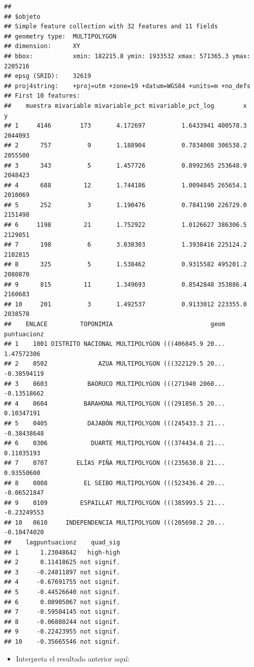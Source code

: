 \documentclass[11pt,]{article}
\providecommand{\tightlist}{%
\setlength{\itemsep}{0pt}\setlength{\parskip}{0pt}}
\begin{document}
\begin{verbatim}
## 
## $objeto
## Simple feature collection with 32 features and 11 fields
## geometry type:  MULTIPOLYGON
## dimension:      XY
## bbox:           xmin: 182215.8 ymin: 1933532 xmax: 571365.3 ymax: 2205216
## epsg (SRID):    32619
## proj4string:    +proj=utm +zone=19 +datum=WGS84 +units=m +no_defs
## First 10 features:
##    muestra mivariable mivariable_pct mivariable_pct_log        x       y
## 1     4146        173       4.172697          1.6433941 400578.3 2044093
## 2      757          9       1.188904          0.7834008 306538.2 2055500
## 3      343          5       1.457726          0.8992365 253648.9 2048423
## 4      688         12       1.744186          1.0094845 265654.1 2010069
## 5      252          3       1.190476          0.7841190 226729.0 2151498
## 6     1198         21       1.752922          1.0126627 386306.5 2129851
## 7      198          6       3.030303          1.3938416 225124.2 2102815
## 8      325          5       1.538462          0.9315582 495201.2 2080870
## 9      815         11       1.349693          0.8542848 353886.4 2160683
## 10     201          3       1.492537          0.9133012 223355.0 2038578
##    ENLACE         TOPONIMIA                           geom puntuacionz
## 1    1001 DISTRITO NACIONAL MULTIPOLYGON (((406845.9 20...  1.47572306
## 2    0502              AZUA MULTIPOLYGON (((322129.5 20... -0.38594119
## 3    0603           BAORUCO MULTIPOLYGON (((271940 2060... -0.13518662
## 4    0604          BARAHONA MULTIPOLYGON (((291856.5 20...  0.10347191
## 5    0405           DAJABÓN MULTIPOLYGON (((245433.3 21... -0.38438648
## 6    0306            DUARTE MULTIPOLYGON (((374434.8 21...  0.11035193
## 7    0707        ELÍAS PIÑA MULTIPOLYGON (((235630.8 21...  0.93550600
## 8    0808          EL SEIBO MULTIPOLYGON (((523436.4 20... -0.06521847
## 9    0109         ESPAILLAT MULTIPOLYGON (((385993.5 21... -0.23249553
## 10   0610     INDEPENDENCIA MULTIPOLYGON (((205698.2 20... -0.10474020
##    lagpuntuacionz    quad_sig
## 1      1.23048642   high-high
## 2      0.11418625 not signif.
## 3     -0.24811897 not signif.
## 4     -0.67691755 not signif.
## 5     -0.44526640 not signif.
## 6      0.08905067 not signif.
## 7     -0.59504145 not signif.
## 8     -0.06880244 not signif.
## 9     -0.22423955 not signif.
## 10    -0.35665546 not signif.
\end{verbatim}

\begin{itemize}
\tightlist
\item
  Interpreta el resultado anterior aquí:
\end{itemize}
\end{document}
